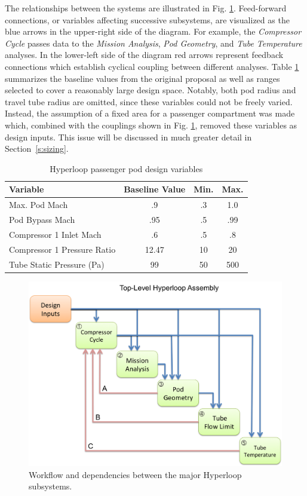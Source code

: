 \documentclass[heading.tex]{subfiles}
\begin{document}
The relationships between the systems are illustrated in Fig. \ref{f:hyperloopXDSM}. 
Feed-forward connections, or variables affecting successive subsystems,
are visualized as the blue arrows in the upper-right side of the diagram.
For example, the \textit{Compressor Cycle} passes data to the \textit{Mission Analysis},
\textit{Pod Geometry}, and \textit{Tube Temperature} analyses.
In the lower-left side of the diagram red arrows represent feedback connections which establish cyclical coupling between different analyses.
Table \ref{tab:desvars} summarizes the baseline values from the original proposal as well as ranges selected 
to cover a reasonably large design space. 
Notably, both pod radius and travel tube radius are omitted, since these variables could not be freely varied.
Instead, the assumption of a fixed area for a passenger compartment was made which,
combined with the couplings shown in Fig. \ref{f:hyperloopXDSM}, removed these variables as design inputs.
This issue will be discussed in much greater detail in Section~\ref{s:sizing}.

\begin{table}
    \centering
    \caption{Hyperloop passenger pod design variables}
    \label{tab:desvars}
    \begin{tabular}{l  c  c  c} 
        \hline
        Variable & Baseline Value & Min. & Max. \\ \hline 
        Max. Pod Mach & .9 & .3 & 1.0 \\ 
        Pod Bypass Mach & .95 & .5 & .99 \\
        Compressor 1 Inlet Mach & .6 & .5 & .8 \\ 
        Compressor 1 Pressure Ratio & 12.47 & 10 & 20 \\ 
        Tube Static Pressure (Pa) & 99 & 50 & 500 \\ \hline
    \end{tabular}
\end{table}

\begin{figure}[hbtp]
\centering
\includegraphics[width=\textwidth]{images/TopAssembly.png}
\caption{Workflow and dependencies between the major Hyperloop subsystems.}
\label{f:hyperloopXDSM}
\end{figure}
\end{document}
